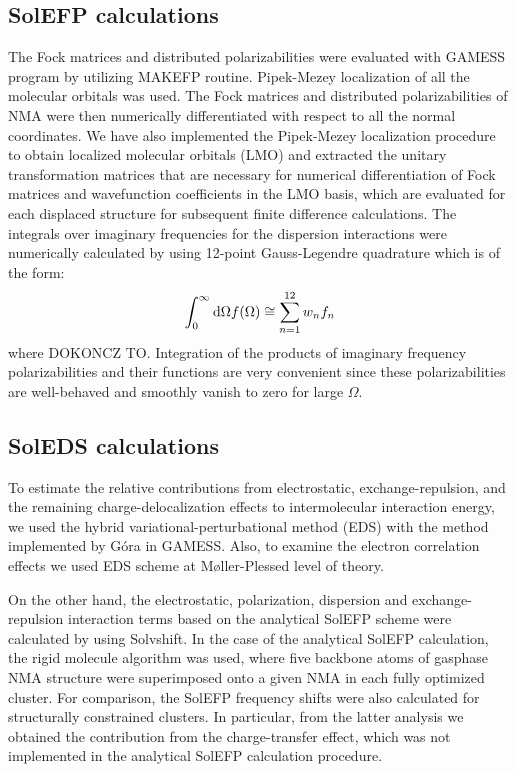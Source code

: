 \documentclass[a4paper,titlepage,twoside,fleqn,12pt]{book}
\begin{document}
\begin{appendices}
\begin{refsection}
\subsection{SolEFP calculations}

The Fock matrices and distributed polarizabilities were
evaluated with GAMESS program by utilizing MAKEFP routine.
Pipek\hyp{}Mezey localization%
of all the molecular orbitals was
used. The Fock matrices and distributed polarizabilities of
NMA were then numerically differentiated with respect to all
the normal coordinates. We have also implemented the Pipek\hyp{}Mezey 
localization procedure to obtain localized molecular
orbitals (LMO) and extracted the unitary transformation matrices
that are necessary for numerical differentiation of Fock
matrices and wavefunction coefficients in the LMO basis,
which are evaluated for each displaced structure for subsequent
finite difference calculations. 
The integrals over
imaginary frequencies for the dispersion interactions were
numerically calculated by using 12\hyp{}point Gauss\hyp{}Legendre
quadrature which is of the form:%
%
\begin{equation}
 \int_0^\infty {\rm d}\Omega f(\Omega) \cong \sum_{n=1}^{12} w_n f_n
\end{equation}
%
where DOKONCZ TO. Integration of the products of imaginary frequency
polarizabilities and their functions are very convenient since
these polarizabilities are well\hyp{}behaved and
smoothly vanish to zero for large $\Omega$.

\subsection{SolEDS calculations}

To estimate the relative contributions from electrostatic,
exchange\hyp{}repulsion, and the remaining charge\hyp{}delocalization
effects to intermolecular interaction energy, we
used the hybrid variational\hyp{}perturbational method (EDS)%
with the
method implemented by G{\'o}ra%
in GAMESS. Also, to examine the electron correlation effects 
we used EDS scheme at M{\o}ller\hyp{}Plessed level of theory.

On the other
hand, the electrostatic, polarization, dispersion and exchange\hyp{}repulsion
interaction terms based on the analytical SolEFP scheme
were calculated by using {\sc Solvshift}. In the
case of the analytical SolEFP calculation, the rigid molecule
algorithm%
was used, where five backbone atoms of gasphase
NMA structure were superimposed onto a given NMA
in each fully optimized cluster. For comparison, the SolEFP
frequency shifts were also calculated for structurally constrained
clusters. In particular, from the latter analysis we
obtained the contribution from the charge\hyp{}transfer effect,
which was not implemented in the analytical SolEFP calculation
procedure. 


\end{refsection}
\end{appendices}
\end{document}
